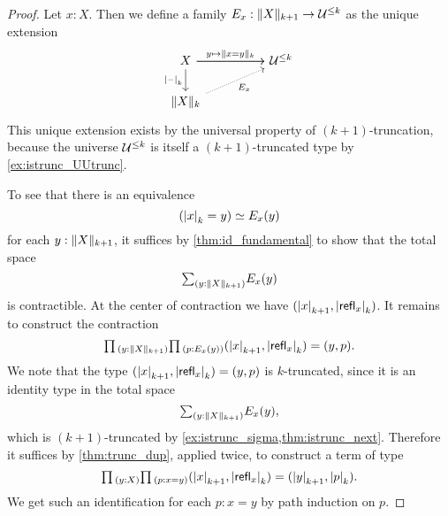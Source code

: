 \begin{proof}
Let $x:X$. Then we define a family $E_x : \trunc{k+1}{X}\to \UU^{\leq k}$ as the unique extension
\begin{equation*}
\begin{tikzcd}[column sep=huge]
X \arrow[r] \arrow[d,swap,"\tproj{k}{\blank}"] \arrow[r,"{y\mapsto \trunc{k}{x=y}}"] & \UU^{\leq k} \\
\trunc{k}{X} \arrow[ur,densely dotted,swap,"E_x"] 
\end{tikzcd}
\end{equation*}
This unique extension exists by the universal property of $(k+1)$-truncation, because the universe $\UU^{\leq k}$ is itself a $(k+1)$-truncated type by \cref{ex:istrunc_UUtrunc}. 

To see that there is an equivalence 
\begin{equation*}
\eqv{(\tproj{k}{x}=y)}{E_x(y)}
\end{equation*}
for each $y:\trunc{k+1}{X}$, it suffices by \cref{thm:id_fundamental} to show that the total space 
\begin{equation*}
\sm{y:\trunc{k+1}{X}}E_x(y)
\end{equation*}
is contractible. At the center of contraction we have $(\tproj{k+1}{x},\tproj{k}{\refl{x}})$. It remains to construct the contraction
\begin{equation*}
\prd{y:\trunc{k+1}{X}}{p:E_x(y)} (\tproj{k+1}{x},\tproj{k}{\refl{x}})=(y,p).
\end{equation*}
We note that the type $(\tproj{k+1}{x},\tproj{k}{\refl{x}})=(y,p)$ is $k$-truncated, since it is an identity type in the total space
\begin{equation*}
\sm{y:\trunc{k+1}{X}}E_x(y),
\end{equation*}
which is $(k+1)$-truncated by \cref{ex:istrunc_sigma,thm:istrunc_next}. Therefore it suffices by \cref{thm:trunc_dup}, applied twice, to construct a term of type
\begin{equation*}
\prd{y:X}{p:x=y} (\tproj{k+1}{x},\tproj{k}{\refl{x}})=(\tproj{k+1}{y},\tproj{k}{p}).
\end{equation*}
We get such an identification for each $p:x=y$ by path induction on $p$.
\end{proof}

